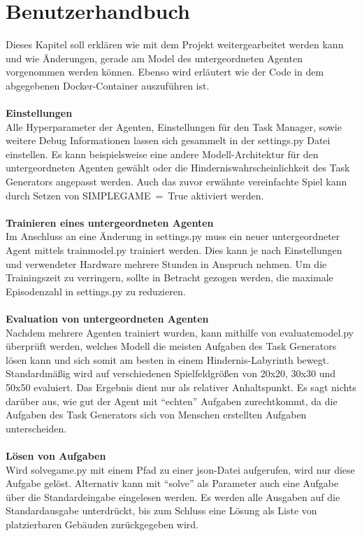 \section{Benutzerhandbuch}\label{cap:benutzerhandbuch}
Dieses Kapitel soll erklären wie mit dem Projekt weitergearbeitet werden kann und wie Änderungen, gerade am Model des untergeordneten Agenten vorgenommen werden können. Ebenso wird erläutert wie der Code in dem abgegebenen Docker-Container auszuführen ist.
\\\\
\textbf{Einstellungen}\\
Alle Hyperparameter der Agenten, Einstellungen für den Task Manager, sowie weitere Debug Informationen lassen sich gesammelt in der settings.py Datei einstellen. 
Es kann beispielsweise eine andere Modell-Architektur für den untergeordneten Agenten gewählt oder die Hinderniswahrscheinlichkeit des Task Generators angepasst werden. Auch das zuvor erwähnte vereinfachte Spiel kann durch Setzen von \mbox{SIMPLE\textunderscore{}GAME = True}
aktiviert werden. 
\\\\
\textbf{Trainieren eines untergeordneten Agenten}\\
Im Anschluss an eine Änderung in settings.py muss ein neuer untergeordneter Agent mittels train\textunderscore{}model.py trainiert werden. Dies kann je nach Einstellungen und verwendeter Hardware mehrere Stunden in Anspruch nehmen. Um die Trainingszeit zu verringern, sollte in Betracht gezogen werden, die maximale Episodenzahl in \mbox{settings.py} zu reduzieren.
\\\\
\textbf{Evaluation von untergeordneten Agenten}\\
Nachdem mehrere Agenten trainiert wurden, kann mithilfe von evaluate\textunderscore{}model.py überprüft werden, welches Modell die meisten Aufgaben des Task Generators lösen kann und sich somit am besten in einem Hindernis-Labyrinth bewegt. Standardmäßig wird auf verschiedenen Spielfeldgrößen von 20x20, 30x30 und 50x50 evaluiert.
Das Ergebnis dient nur als relativer Anhaltspunkt. Es sagt nichts darüber aus, wie gut der Agent mit “echten” Aufgaben zurechtkommt, da die Aufgaben des Task Generators sich von Menschen erstellten Aufgaben unterscheiden. 
\\\\
\textbf{Lösen von Aufgaben}\\
Wird solve\textunderscore{}game.py mit einem Pfad zu einer json-Datei aufgerufen, wird nur diese Aufgabe gelöst. Alternativ kann mit “solve” als Parameter auch eine Aufgabe über die Standardeingabe eingelesen werden. Es werden alle Ausgaben auf die Standardausgabe unterdrückt, bis zum Schluss eine Lösung als Liste von platzierbaren Gebäuden zurückgegeben wird. 
